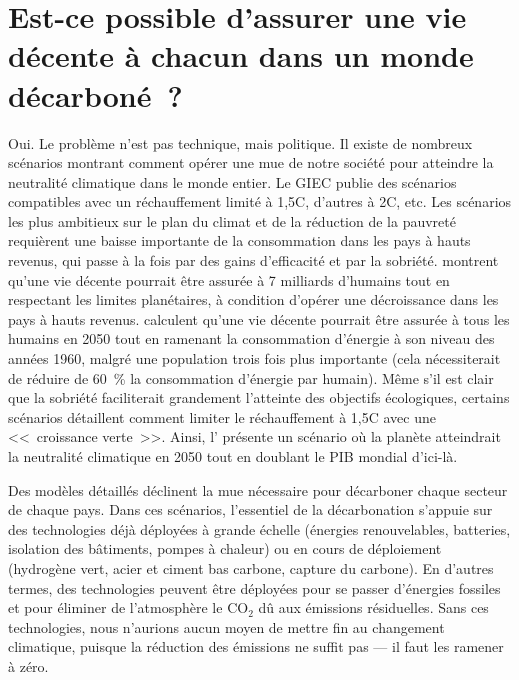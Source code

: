 \documentclass[a5paper,french,openany]{memoir}
\begin{document}
\section*{\normalsize Est-ce possible d'assurer une vie décente à chacun dans un monde décarboné~?}\label{q:decent}

Oui. Le problème n'est pas technique, mais politique. Il existe de nombreux scénarios montrant comment opérer une mue de notre société pour atteindre la neutralité climatique dans le monde entier. Le GIEC publie des scénarios compatibles avec un réchauffement limité à 1,5\textdegree{}C, d'autres à 2\textdegree{}C, etc. Les scénarios les plus ambitieux sur le plan du climat et de la réduction de la pauvreté requièrent une baisse importante de la consommation dans les pays à hauts revenus, qui passe à la fois par des gains d'efficacité et par la sobriété. \cite{oneill_good_2018,hickel_is_2019} montrent qu'une vie décente pourrait être assurée à 7 milliards d'humains tout en respectant les limites planétaires, à condition d'opérer une décroissance dans les pays à hauts revenus. \cite{millward-hopkins_providing_2020} calculent qu'une vie décente pourrait être assurée à tous les humains en 2050 tout en ramenant la consommation d'énergie à son niveau des années 1960, malgré une population trois fois plus importante (cela nécessiterait de réduire de 60~\% la consommation d'énergie par humain). Même s'il est clair que la sobriété faciliterait grandement l'atteinte des objectifs écologiques, certains scénarios détaillent comment limiter le réchauffement à 1,5\textdegree{}C avec une <<~croissance verte~>>. Ainsi, l'\cite{agence_internationale_de_lenergie_net_2023} présente un scénario où la planète atteindrait la neutralité climatique en 2050 tout en doublant le PIB mondial d'ici-là. 

Des modèles détaillés déclinent la mue nécessaire pour décarboner chaque secteur de chaque pays. Dans ces scénarios, l'essentiel de la décarbonation s'appuie sur des technologies déjà déployées à grande échelle (énergies renouvelables, batteries, isolation des bâtiments, pompes à chaleur) ou en cours de déploiement (hydrogène vert, acier et ciment bas carbone, capture du carbone). En d'autres termes, des technologies peuvent être déployées pour se passer d'énergies fossiles et pour éliminer de l'atmosphère le CO$_\text{2}$ dû aux émissions résiduelles. Sans ces technologies, nous n'aurions aucun moyen de mettre fin au changement climatique, puisque la réduction des émissions ne suffit pas --- il faut les ramener à zéro. 
\end{document}
